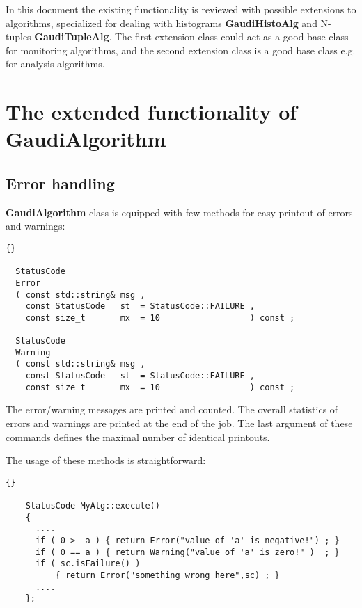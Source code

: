 \documentclass{lhcbnote}
\newcommand{\bftt}         {\ttfamily\bfseries}
\begin{document}
In this document the existing functionality is reviewed 
with possible extensions to 
algorithms, specialized for dealing with histograms 
{\bftt{GaudiHistoAlg}} and N-tuples 
{\bftt{GaudiTupleAlg}}. The first extension class 
could act as a good base class for monitoring algorithms, 
and the second extension class is a good base class 
e.g. for analysis algorithms.   

\chapter{The extended functionality of {\bftt{GaudiAlgorithm}} } 

\section{Error handling}

{\bftt{GaudiAlgorithm}} class is equipped with 
few methods for easy printout of errors and warnings:

\begin{scriptsize}
 \begin{lstlisting}{}

  StatusCode 
  Error     
  ( const std::string& msg , 
    const StatusCode   st  = StatusCode::FAILURE ,
    const size_t       mx  = 10                  ) const ;
  
  StatusCode 
  Warning   
  ( const std::string& msg , 
    const StatusCode   st  = StatusCode::FAILURE ,
    const size_t       mx  = 10                  ) const ;

 \end{lstlisting}
\end{scriptsize}

The error/warning messages are printed and counted.
The overall statistics of errors and warnings are 
printed at the end of the job. The last argument of 
these commands defines the maximal number of identical 
printouts.

The usage of these methods is straightforward: 

\begin{scriptsize}
 \begin{lstlisting}{}

    StatusCode MyAlg::execute() 
    {
      ....
      if ( 0 >  a ) { return Error("value of 'a' is negative!") ; }
      if ( 0 == a ) { return Warning("value of 'a' is zero!" )  ; }
      if ( sc.isFailure() ) 
          { return Error("something wrong here",sc) ; }
      ....
    };

 \end{lstlisting}
\end{scriptsize}
\end{document}
